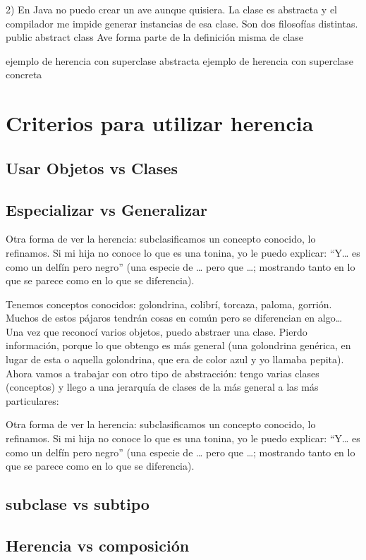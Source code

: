 \documentclass[a4paper,12pt]{book}
\begin{document}
2) En Java no puedo crear un ave aunque quisiera. La clase es abstracta y el compilador
me impide generar instancias de esa clase. Son dos filosofías distintas.
public abstract class Ave forma parte de la definición misma de clase

ejemplo de herencia con superclase abstracta
ejemplo de herencia con superclase concreta

\section{Criterios para utilizar herencia}
\subsection{Usar Objetos vs Clases}
\subsection{Especializar vs Generalizar}

Otra forma de ver la herencia: subclasificamos un concepto conocido, lo refinamos. Si mi hija
no conoce lo que es una tonina, yo le puedo explicar: “Y… es como un delfín pero negro” (una
especie de … pero que …; mostrando tanto en lo que se parece como en lo que se diferencia). 

Tenemos conceptos conocidos: golondrina, colibrí, torcaza, paloma, gorrión. Muchos de estos
pájaros tendrán cosas en común pero se diferencian en algo…
Una vez que reconocí varios objetos, puedo abstraer una clase. Pierdo información, porque lo
que obtengo es más general (una golondrina genérica, en lugar de esta o aquella golondrina,
que era de color azul y yo llamaba pepita).
Ahora vamos a trabajar con otro tipo de abstracción: tengo varias clases (conceptos) y llego a
una jerarquía de clases de la más general a las más particulares: 

Otra forma de ver la herencia: subclasificamos un concepto conocido, lo refinamos. Si mi hija
no conoce lo que es una tonina, yo le puedo explicar: “Y… es como un delfín pero negro” (una
especie de … pero que …; mostrando tanto en lo que se parece como en lo que se diferencia).

\subsection{subclase vs subtipo}
\subsection{Herencia vs composición}

  
\end{document}
